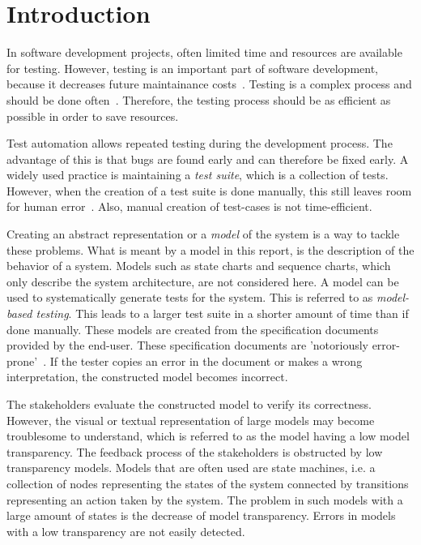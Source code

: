 \section{Introduction}\label{sec:introduction}
In software development projects, often limited time and resources are available for testing. However, testing is an important part of software development, because it decreases future maintainance costs~\cite{McConnell:testing}. Testing is a complex process and should be done often~\cite{Pol:testing}. Therefore, the testing process should be as efficient as possible in order to save resources.

Test automation allows repeated testing during the development process. The advantage of this is that bugs are found early and can therefore be fixed early.  A widely used practice is maintaining a \textit{test suite}, which is a collection of tests. However, when the creation of a test suite is done manually, this still leaves room for human error~\cite{Blackburn:testing}. Also, manual creation of test-cases is not time-efficient.

Creating an abstract representation or a \textit{model} of the system is a way to tackle these problems. What is meant by a model in this report, is the description of the behavior of a system. Models such as state charts and sequence charts, which only describe the system architecture, are not considered here. A model can be used to systematically generate tests for the system. This is referred to as \textit{model-based testing}. This leads to a larger test suite in a shorter amount of time than if done manually. These models are created from the specification documents provided by the end-user. These specification documents are 'notoriously error-prone'~\cite{McCabe:testing}. If the tester copies an error in the document or makes a wrong interpretation, the constructed model becomes incorrect.

The stakeholders evaluate the constructed model to verify its correctness. However, the visual or textual representation of large models may become troublesome to understand, which is referred to as the model having a low model transparency. The feedback process of the stakeholders is obstructed by low transparency models. Models that are often used are state machines, i.e. a collection of nodes representing the states of the system connected by transitions representing an action taken by the system. The problem in such models with a large amount of states is the decrease of model transparency. Errors in models with a low transparency are not easily detected.


